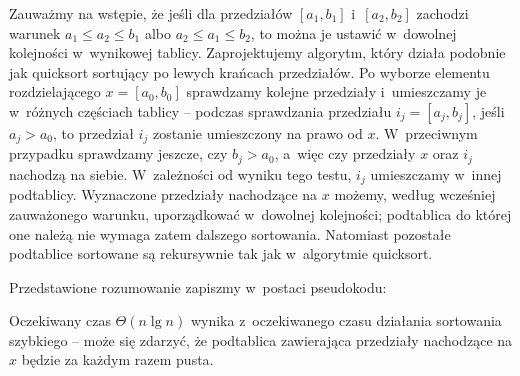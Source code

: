 
\subproblem %
Zauważmy na wstępie, że jeśli dla przedziałów $[a_1,b_1]$ i~$[a_2,b_2]$ zachodzi warunek $a_1\le a_2\le b_1$ albo $a_2\le a_1\le b_2$, to można je ustawić w~dowolnej kolejności w~wynikowej tablicy. Zaprojektujemy algorytm, który działa podobnie jak quicksort sortujący po lewych krańcach przedziałów. Po wyborze elementu rozdzielającego $x=[a_0,b_0]$ sprawdzamy kolejne przedziały i~umieszczamy je w~różnych częściach tablicy -- podczas sprawdzania przedziału $i_j=[a_j,b_j]$, jeśli $a_j>a_0$, to przedział $i_j$ zostanie umieszczony na prawo od $x$. W~przeciwnym przypadku sprawdzamy jeszcze, czy $b_j>a_0$, a~więc czy przedziały $x$ oraz $i_j$ nachodzą na siebie. W~zależności od wyniku tego testu, $i_j$ umieszczamy w~innej podtablicy. Wyznaczone przedziały nachodzące na $x$ możemy, według wcześniej zauważonego warunku, uporządkować w~dowolnej kolejności; podtablica do której one należą nie wymaga zatem dalszego sortowania. Natomiast pozostałe podtablice sortowane są rekursywnie tak jak w~algorytmie quicksort.

Przedstawione rozumowanie zapiszmy w~postaci pseudokodu:
\begin{codebox}
\end{codebox}

\subproblem %
Oczekiwany czas $\Theta(n\lg n)$ wynika z~oczekiwanego czasu działania sortowania szybkiego -- może się zdarzyć, że podtablica zawierająca przedziały nachodzące na $x$ będzie za każdym razem pusta.

\endinput
